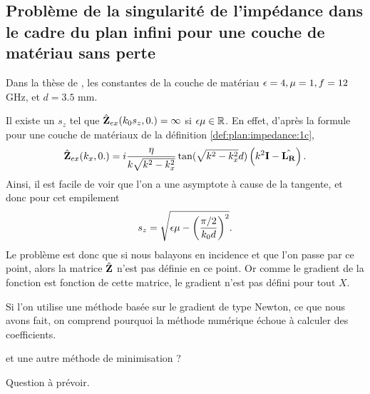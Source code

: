 \subsection{Problème de la singularité de l'impédance dans le cadre du plan infini pour une couche de matériau sans perte}

Dans la thèse de \cite{aubakirov_electromagnetic_2014}, les constantes de la couche de matériau \(\epsilon=4,\mu=1,f=12\) GHz, et \(d=3.5\) mm. 

Il existe un \(s_z\) tel que \(\hat{\mathbf{Z}}_{ex}(k_0s_z,0.) = \infty\) si \(\epsilon\mu\in\mathbb R\).
En effet, d'après la formule pour une couche de matériaux de la définition \ref{def:plan:impedance:1c}, 
\begin{equation}
  \hat{\mathbf{Z}}_{ex}(k_x,0.) = i\dfrac{\eta}{k\sqrt{k^2 - k_x^2}}\tan(\sqrt{k^2 - k_x^2}d)\left(k^2\mathbf{I} - \hat{\mathbf{L_R}}\right).
\end{equation}
Ainsi, il est facile de voir que l'on a une asymptote à cause de la tangente, et donc pour cet empilement
\begin{equation}
  \label{eq:plan:asymptote_1_couche}
  s_z = \sqrt{\epsilon \mu - \left(\dfrac{\pi/2}{k_0 d}\right)^2}.
\end{equation}
Le problème est donc que si nous balayons en incidence et que l'on passe par ce point, alors la matrice \(\hat{\mathbf{Z}}\) n'est pas définie en ce point.
Or comme le gradient de la fonction est fonction de cette matrice, le gradient n'est pas défini pour tout \(X\).

Si l'on utilise une méthode basée sur le gradient de type Newton, ce que nous avons fait, on comprend pourquoi la méthode numérique échoue à calculer des coefficients.

\begin{REM}
et une autre méthode de minimisation ?
\end{REM} 
\begin{REP}
  Question à prévoir.
\end{REP}

